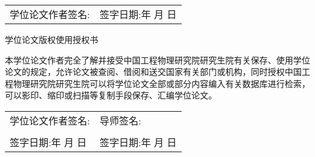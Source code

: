 \vspace{30pt}

\noindent \begin{tabular}{@{}p{}p{}}
  学位论文作者签名: & 签字日期:\qquad \quad 年 \quad 月 \quad 日
\end{tabular}

\vspace{80pt}
\begin{center}
  学位论文版权使用授权书
\end{center}

\vspace{30pt}
\par 本学位论文作者完全了解并接受中国工程物理研究院研究生院有关保存、使用学位论文的规定，允许论文被查阅、借阅和送交国家有关部门或机构，同时授权中国工程物理研究院研究生院可以将学位论文全部或部分内容编入有关数据库进行检索，可以影印、缩印或扫描等复制手段保存、汇编学位论文。

\vspace{40pt}
\begin{flushleft}
\begin{tabular}{@{}p{}p{}}
学位论文作者签名:                          & 导师签名:                                  \\
  \\
签字日期:\qquad \quad 年 \quad 月 \quad 日 & 签字日期:\qquad \quad 年 \quad 月 \quad 日
\end{tabular}
\end{flushleft}


\cleardoublepage

\pagestyle{fancy}